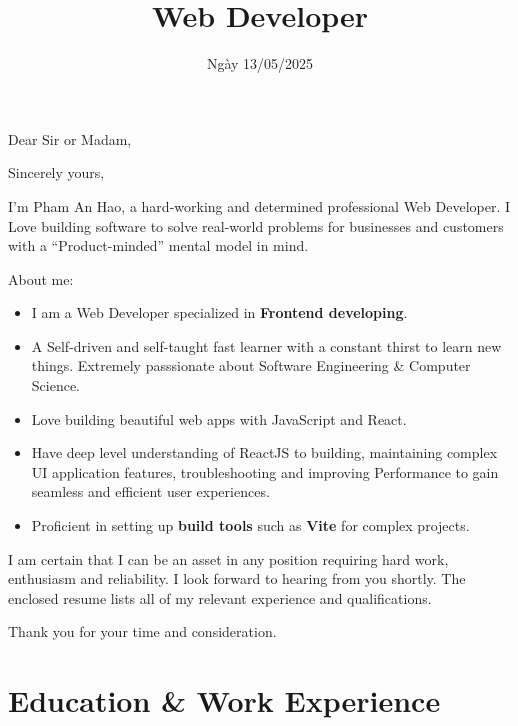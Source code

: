 \documentclass[11pt,a4paper,sans]{moderncv}        %
\title{Web Developer}
\begin{document}
\clearpage

\date{Ngày 13/05/2025}
\opening{Dear Sir or Madam,}
\closing{Sincerely yours,}
\makelettertitle

I'm Pham An Hao, a hard-working and determined professional Web Developer. I Love building software to solve real-world problems for businesses and customers with a ``Product-minded'' mental model in mind.

About me:


\begin{itemize}
  \item I am a Web Developer specialized in \textbf{Frontend developing}.
  \item A Self-driven and self-taught fast learner with a constant thirst to learn new things. Extremely passsionate about Software Engineering \& Computer Science.
  \item Love building beautiful web apps with JavaScript and React.
  \item Have deep level understanding of ReactJS to building, maintaining complex UI application features, troubleshooting and improving Performance to gain seamless and efficient user experiences.
  \item Proficient in setting up \textbf{build tools} such as \textbf{Vite} for complex projects.
\end{itemize}

I am certain that I can be an asset in any position requiring hard work, enthusiasm and reliability. I look forward to hearing from you shortly. The enclosed resume lists all of my relevant experience and qualifications.

Thank you for your time and consideration.

\makeletterclosing

\newpage


\makecvtitle

\section{Education \& Work Experience}
\end{document}
